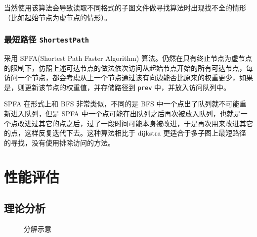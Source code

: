 \documentclass[a4paper,12pt]{article}
\begin{document}
\begin{CJK}{UTF8}{song}
当然使用该算法会导致读取不同格式的子图文件做寻找算法时出现找不全的情形（比如起始节点为虚节点的情形）。

\hypertarget{header-n211}{%
\subsubsection{\texorpdfstring{最短路径
\texttt{ShortestPath}}{最短路径 ShortestPath}}\label{header-n211}}

采用 SPFA(Shortest Path Faster Algorithm) 算法。仍然在只有终止节点为虚节点的限制下，仿照上述可达节点的做法依次访问从起始节点开始的所有可达节点，每访问一个节点，都会考虑从上一个节点通过该有向边能否比原来的权重更少，如果是，则更新该节点的权重值，并存储路径到 \texttt{prev} 中，并放入访问队列中。

SPFA 在形式上和 BFS 非常类似，不同的是 BFS 中一个点出了队列就不可能重新进入队列，但是 SPFA 中一个点可能在出队列之后再次被放入队列，也就是一个点改进过其它的点之后，过了一段时间可能本身被改进，于是再次用来改进其它的点，这样反复迭代下去。\cite{spfa}这种算法相比于
dijkstra 更适合于多子图上最短路径的寻找，没有使用排除访问的方法。

\section{性能评估}

\subsection{理论分析}

\begin{figure}[H]
  \centering
  
  \caption{分解示意}
\end{figure}


\end{CJK}
\end{document}
